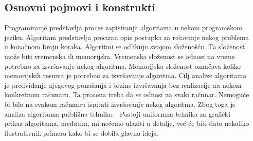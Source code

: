 \documentclass[a4paper]{article}
\begin{document}
\subsection{Osnovni pojmovi i konstrukti}
Programiranje predstavlja proces zapisivanja algoritama u nekom programskom jeziku.
Algoritam predstavlja precizan opis postupka za rešavanje nekog problema u konačnom broju koraka. Algoritmi se odlikuju svojom složenošću. Ta složenost može biti vremenska ili memorijska. Vremenska složenost se odnosi na vreme potrebno za izvršavanje nekog algoritma. Memorijska složenost označava koliko memorijskih resursa je potrebno za izvršavanje algoritma. Cilj analize algoritama je predviđanje njegovog ponašanja i brzine izvršavanja bez realizacije na nekom konkretnom računaru. Ta procena treba da se odnosi na svaki računar. Nemoguće bi bilo na svakom računaru ispitati izvršavanje nekog algoritma. Zbog toga je analiza algoritama približna tehnika.~\cite{Zivkovic} Postoji uniformna tehnika za grafički prikaz algoritama, međutim, mi nećemo ulaziti u detalje, već će biti dato nekoliko ilustrativnih primera kako bi se dobila glavna ideja.
\end{document}
